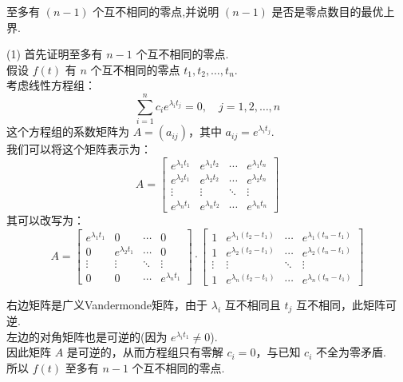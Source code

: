 \begin{enumerate}
    至多有 $(n - 1)$ 个互不相同的零点,并说明 $(n - 1)$ 是否是零点数目的最优上界.
    \begin{solution}
        (1) 首先证明至多有 $n-1$ 个互不相同的零点.\\
        假设 $f(t)$ 有 $n$ 个互不相同的零点 $t_1, t_2, \ldots, t_n$.\\
        考虑线性方程组：
        \[
        \sum_{i=1}^n c_i e^{\lambda_i t_j} = 0, \quad j = 1, 2, \ldots, n
        \]
        这个方程组的系数矩阵为 $A = (a_{ij})$，其中 $a_{ij} = e^{\lambda_i t_j}$.\\
        我们可以将这个矩阵表示为：
        \[
        A = 
        \begin{bmatrix}
            e^{\lambda_1 t_1} & e^{\lambda_1 t_2} & \cdots & e^{\lambda_1 t_n} \\
            e^{\lambda_2 t_1} & e^{\lambda_2 t_2} & \cdots & e^{\lambda_2 t_n} \\
            \vdots & \vdots & \ddots & \vdots \\
            e^{\lambda_n t_1} & e^{\lambda_n t_2} & \cdots & e^{\lambda_n t_n}
        \end{bmatrix}
        \]
        其可以改写为：
        \[
        A = 
        \begin{bmatrix}
            e^{\lambda_1 t_1} & 0 & \cdots & 0 \\
            0 & e^{\lambda_2 t_1} & \cdots & 0 \\
            \vdots & \vdots & \ddots & \vdots \\
            0 & 0 & \cdots & e^{\lambda_n t_1}
        \end{bmatrix}
        \cdot
        \begin{bmatrix}
            1 & e^{\lambda_1 (t_2-t_1)} & \cdots & e^{\lambda_1 (t_n-t_1)} \\
            1 & e^{\lambda_2 (t_2-t_1)} & \cdots & e^{\lambda_2 (t_n-t_1)} \\
            \vdots & \vdots & \ddots & \vdots \\
            1 & e^{\lambda_n (t_2-t_1)} & \cdots & e^{\lambda_n (t_n-t_1)}
        \end{bmatrix}
        \]

        右边矩阵是广义Vandermonde矩阵，由于 $\lambda_i$ 互不相同且 $t_j$ 互不相同，此矩阵可逆.\\
        左边的对角矩阵也是可逆的(因为 $e^{\lambda_i t_1} \neq 0$).\\
        因此矩阵 $A$ 是可逆的，从而方程组只有零解 $c_i = 0$，与已知 $c_i$ 不全为零矛盾. \\
        所以 $f(t)$ 至多有 $n-1$ 个互不相同的零点.


\end{solution}
\end{enumerate}
